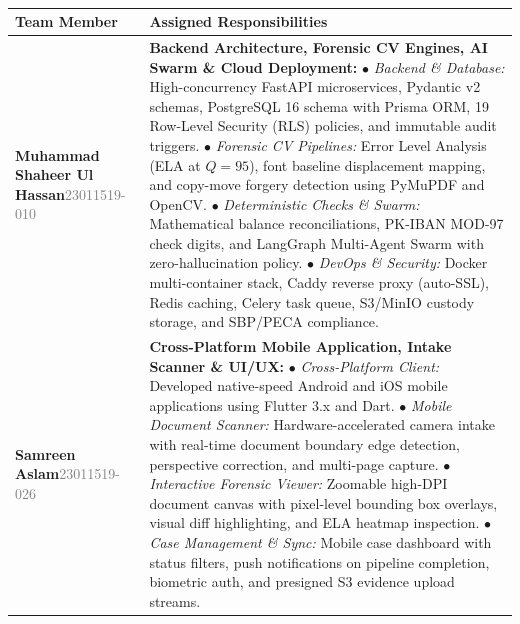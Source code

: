 \documentclass[12pt,a4paper]{article}
\begin{document}
\vspace{10pt}
\\[6pt]
\begin{table}[h]
\centering
\footnotesize
\begin{tabularx}{\textwidth}{p{3.5cm}X}
\toprule
\textbf{Team Member} & \textbf{Assigned Responsibilities} \\
\midrule
\textbf{Muhammad Shaheer Ul Hassan}\newline \textcolor{gray}{23011519-010} & 
\textbf{Backend Architecture, Forensic CV Engines, AI Swarm \& Cloud Deployment:}\newline
$\bullet$ \textit{Backend \& Database:} High-concurrency FastAPI microservices, Pydantic v2 schemas, PostgreSQL 16 schema with Prisma ORM, 19 Row-Level Security (RLS) policies, and immutable audit triggers.\newline
$\bullet$ \textit{Forensic CV Pipelines:} Error Level Analysis (ELA at $Q=95$), font baseline displacement mapping, and copy-move forgery detection using PyMuPDF and OpenCV.\newline
$\bullet$ \textit{Deterministic Checks \& Swarm:} Mathematical balance reconciliations, PK-IBAN MOD-97 check digits, and LangGraph Multi-Agent Swarm with zero-hallucination policy.\newline
$\bullet$ \textit{DevOps \& Security:} Docker multi-container stack, Caddy reverse proxy (auto-SSL), Redis caching, Celery task queue, S3/MinIO custody storage, and SBP/PECA compliance. \\
\midrule
\textbf{Samreen Aslam}\newline \textcolor{gray}{23011519-026} & 
\textbf{Cross-Platform Mobile Application, Intake Scanner \& UI/UX:}\newline
$\bullet$ \textit{Cross-Platform Client:} Developed native-speed Android and iOS mobile applications using Flutter 3.x and Dart.\newline
$\bullet$ \textit{Mobile Document Scanner:} Hardware-accelerated camera intake with real-time document boundary edge detection, perspective correction, and multi-page capture.\newline
$\bullet$ \textit{Interactive Forensic Viewer:} Zoomable high-DPI document canvas with pixel-level bounding box overlays, visual diff highlighting, and ELA heatmap inspection.\newline
$\bullet$ \textit{Case Management \& Sync:} Mobile case dashboard with status filters, push notifications on pipeline completion, biometric auth, and presigned S3 evidence upload streams. \\

\end{tabularx}
\end{table}
\end{document}
